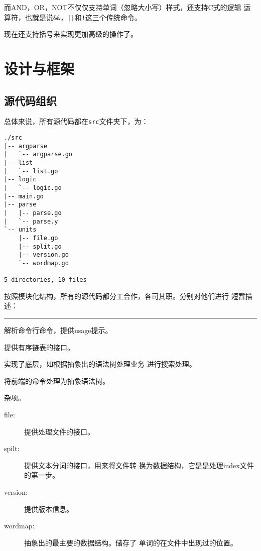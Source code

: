 \documentclass{peterlitsdoc}
\def\hline{\begingroup
    \noindent\pltgray\rule{\textwidth}{0.5pt}%
    \endgroup}
\def\textline{\hline}
\begin{document}
而AND，OR，NOT不仅仅支持单词（忽略大小写）样式，还支持C式的逻辑
运算符，也就是说\verb|&&|，\verb-||-和\verb|!|这三个传统命令。

现在还支持括号来实现更加高级的操作了。


\section{设计与框架}

\subsection{源代码组织}

总体来说，所有源代码都在\verb|src|文件夹下，为：
\begin{lstlisting}
./src
|-- argparse
|   `-- argparse.go
|-- list
|   `-- list.go
|-- logic
|   `-- logic.go
|-- main.go
|-- parse
|   |-- parse.go
|   `-- parse.y
`-- units
    |-- file.go
    |-- split.go
    |-- version.go
    `-- wordmap.go

5 directories, 10 files
\end{lstlisting}

按照模块化结构，所有的源代码都分工合作，各司其职。分别对他们进行
短暂描述：

\textline

\begin{description}[labelindent=\parindent]
    \item[argparse:] 解析命令行命令，提供usage提示。
    \item[list:] 提供有序链表的接口。
    \item[logic] 实现了底层，如根据抽象出的语法树处理业务
        进行搜索处理。
    \item[parse:] 将前端的命令处理为抽象语法树。
    \item[units:] 杂项。
        \begin{description}
            \item[file:] 提供处理文件的接口。
            \item[spilt:] 提供文本分词的接口，用来将文件转
                换为数据结构，它是是处理index文件的第一步。
            \item[version:] 提供版本信息。
            \item[wordmap:] 抽象出的最主要的数据结构。储存了
                单词的在文件中出现过的位置。
        \end{description}
\end{description}
\end{document}
